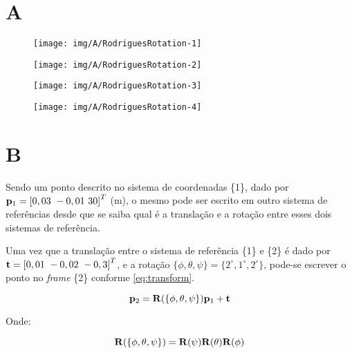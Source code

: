 
\section{A}

\begin{figure}[H]
	\centering
	\texttt{[image: img/A/RodriguesRotation-1]}
	\label{fig:rodriguesrotation-2}
\end{figure}

\begin{figure}[H]
	\centering
	\texttt{[image: img/A/RodriguesRotation-2]}
	\label{fig:rodriguesrotation-3}
\end{figure}

\begin{figure}[H]
	\centering
	\texttt{[image: img/A/RodriguesRotation-3]}
	\label{fig:rodriguesrotation-4}
\end{figure}

\begin{figure}[H]
	\centering
	\texttt{[image: img/A/RodriguesRotation-4]}
	\label{fig:rodriguesrotation-1}
\end{figure}



\section{B}

Sendo um ponto descrito no sistema de coordenadas \{1\}, dado por $\mathbf{p}_1 = \left[ 0,03 \ -0,01 \ 30 \right]^T$ (m), o mesmo pode ser escrito em outro sistema de referências desde que se saiba qual é a translação e a rotação entre esses dois sistemas de referência.

Uma vez que a translação entre o sistema de referência \{1\} e \{2\} é dado por \\ $\mathbf{t} = \left[0,01 \ -0,02 \ -0,3 \right]^T$, e a rotação $\{\phi, \theta, \psi\} = \{2^\circ, 1^\circ, 2^\circ\}$, pode-se escrever o ponto no \textit{frame} \{2\} conforme \eqref{eq:transform}.

\begin{equation}\label{eq:transform}
	\mathbf{p}_2 = \mathbf{R}(\{\phi, \theta, \psi\})\mathbf{p}_1 + \mathbf{t}
\end{equation}

Onde:

\begin{equation}\label{key}
	 \mathbf{R}(\{\phi, \theta, \psi\}) = \mathbf{R}(\psi) \mathbf{R}(\theta)  \mathbf{R}(\phi)
\end{equation}

